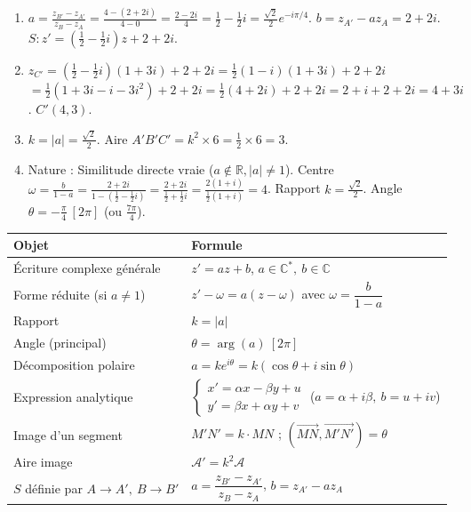 \documentclass[11pt]{article}
\begin{document}
\begin{corrige}
\begin{enumerate}
\item $a = \frac{z_{B'}-z_{A'}}{z_B-z_A} = \frac{4-(2+2i)}{4-0} = \frac{2-2i}{4} = \frac{1}{2} - \frac{1}{2}i = \frac{\sqrt{2}}{2}e^{-i\pi/4}$.
      $b = z_{A'} - a z_A = 2+2i$.
      $S: z' = \left(\frac{1}{2}-\frac{1}{2}i\right)z + 2+2i$.
\item $z_{C'} = \left(\frac{1}{2}-\frac{1}{2}i\right)(1+3i) + 2+2i = \frac{1}{2}(1-i)(1+3i) + 2+2i$
      $= \frac{1}{2}(1+3i-i-3i^2) + 2+2i = \frac{1}{2}(4+2i) + 2+2i = 2+i + 2+2i = 4+3i$.
      $C'(4,3)$.
\item $k = |a| = \frac{\sqrt{2}}{2}$. Aire $A'B'C' = k^2 \times 6 = \frac{1}{2} \times 6 = 3$.
\item Nature : Similitude directe vraie ($a\notin\mathbb{R}, |a|\neq 1$).
      Centre $\omega = \frac{b}{1-a} = \frac{2+2i}{1-(\frac{1}{2}-\frac{1}{2}i)} = \frac{2+2i}{\frac{1}{2}+\frac{1}{2}i} = \frac{2(1+i)}{\frac{1}{2}(1+i)} = 4$.
      Rapport $k = \frac{\sqrt{2}}{2}$. Angle $\theta = -\frac{\pi}{4}\ [2\pi]$ (ou $\frac{7\pi}{4}$).
\end{enumerate}
\end{corrige}

\begin{propriete}
\begin{center}
\begin{tabularx}{\linewidth}{|l|X|}
\hline
\rowcolor{popblueL} \textbf{Objet} & \textbf{Formule} \\
\hline
\'Ecriture complexe g\'en\'erale & $z' = a z + b$, \quad $a \in \mathbb{C}^*,\ b \in \mathbb{C}$ \\
\hline
Forme r\'eduite (si $a \neq 1$) & $z' - \omega = a(z - \omega)$ \quad avec \quad $\omega = \dfrac{b}{1-a}$ \\
\hline
Rapport & $k = |a|$ \\
\hline
Angle (principal) & $\theta = \arg(a)\ [2\pi]$ \\
\hline
D\'ecomposition polaire & $a = k e^{i\theta} = k(\cos\theta + i\sin\theta)$ \\
\hline
Expression analytique & $\begin{cases} x' = \alpha x - \beta y + u \\ y' = \beta x + \alpha y + v \end{cases}$ \quad ($a=\alpha+i\beta,\ b=u+iv$) \\
\hline
Image d'un segment & $M'N' = k \cdot MN$ \quad ; \quad $(\overrightarrow{MN}, \overrightarrow{M'N'}) = \theta$ \\
\hline
Aire image & $\mathcal{A}' = k^2 \mathcal{A}$ \\
\hline
$S$ d\'efinie par $A\to A',\ B\to B'$ & $a = \dfrac{z_{B'}-z_{A'}}{z_B-z_A}$, \quad $b = z_{A'} - a z_A$ \\
\hline
\end{tabularx}
\end{center}
\end{propriete}
\end{document}
